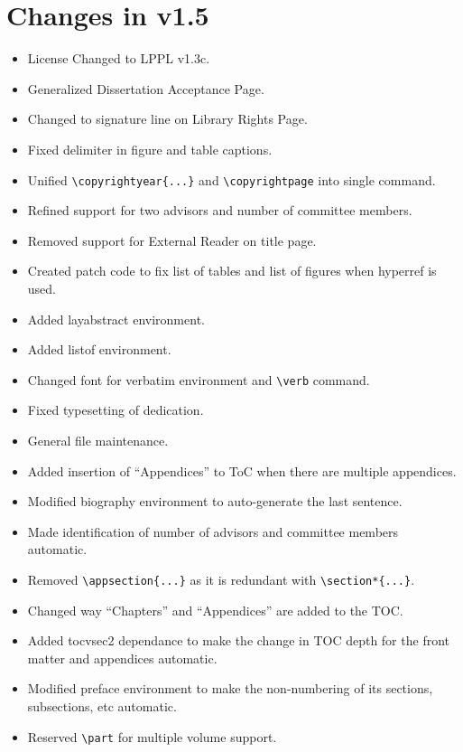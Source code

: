 \section{Changes in v1.5}
\begin{itemize}
\item{License Changed to LPPL v1.3c.}
\item{Generalized Dissertation Acceptance Page.}
\item{Changed to signature line on Library Rights Page.}
\item{Fixed delimiter in figure and table captions.}
\item{Unified \verb=\copyrightyear{...}= and \verb=\copyrightpage= into single command.}
\item{Refined support for two advisors and number of committee members.}
\item{Removed support for External Reader on title page.}
\item{Created patch code to fix list of tables and list of figures when hyperref is used.}
\item{Added layabstract environment.}
\item{Added listof environment.}
\item{Changed font for verbatim environment and \verb=\verb= command.}
\item{Fixed typesetting of dedication.}
\item{General file maintenance.}
\item{Added insertion of ``Appendices'' to ToC when there are multiple appendices.}
\item{Modified biography environment to auto-generate the last sentence.}
\item{Made identification of number of advisors and committee members automatic.}
\item{Removed \verb=\appsection{...}= as it is redundant with \verb=\section*{...}=.}
\item{Changed way ``Chapters'' and ``Appendices'' are added to the TOC.}
\item{Added tocvsec2 dependance to make the change in TOC depth for the front matter and appendices automatic.}
\item{Modified preface environment to make the non-numbering of its sections, subsections, etc automatic.}
\item{Reserved \verb=\part= for multiple volume support.}

\end{itemize}

